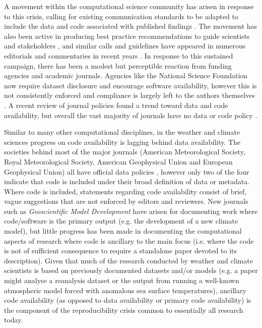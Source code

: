 A movement within the computational science community has arisen in response to this crisis, calling for existing communication standards to be adapted to include the data and code associated with published findings \citep[e.g.][]{Stodden2014}. The movement has also been active in producing best practice recommendations to guide scientists and stakeholders \citep[e.g.][]{Prlic2012,Stodden2012a,Sandve2013,Stodden2014}, and similar calls and guidelines have appeared in numerous editorials and commentaries in recent years \citep[e.g.][]{Barnes2010,Merali2010,Ince2012}. In response to this sustained campaign, there has been a modest but perceptible reaction from funding agencies and academic journals. Agencies like the National Science Foundation now require dataset disclosure and encourage software availability, however this is not consistently enforced and compliance is largely left to the authors themselves \citep{Stodden2013}. A recent review of journal policies found a trend toward data and code availability, but overall the vast majority of journals have no data or code policy \citep{Stodden2013}. 

Similar to many other computational disciplines, in the weather and climate sciences progress on code availability is lagging behind data availability. The societies behind most of the major journals (American Meteorological Society, Royal Meteorological Society, American Geophysical Union and European Geophysical Union) all have official data policies \citep[e.g.][]{Mayernik2015}, however only two of the four indicate that code is included under their broad definition of data or metadata. Where code is included, statements regarding code availability consist of brief, vague suggestions that are not enforced by editors and reviewers. New journals such as \textit{Geoscientific Model Development} have arisen for documenting work where code/software is the primary output (e.g. the development of a new climate model), but little progress has been made in documenting the computational aspects of research where code is ancillary to the main focus (i.e. where the code is not of sufficient consequence to require a standalone paper devoted to its description). Given that much of the research conducted by weather and climate scientists is based on previously documented datasets and/or models (e.g. a paper might analyse a reanalysis dataset or the output from running a well-known atmospheric model forced with anomalous sea surface temperatures), ancillary code availability (as opposed to data availability or primary code availability) is the component of the reproducibility crisis common to essentially all research today.

